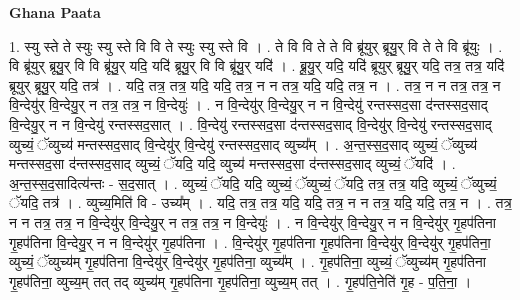 \documentclass[17pt]{extarticle}
\begin{document}
\textbf{Ghana Paata } \newline

1. स्यु स्ते ते स्युः स्यु स्ते वि वि ते स्युः स्यु स्ते वि । . ते वि वि ते ते वि ब्रू॑युर् ब्रूयु॒र् वि ते ते वि ब्रू॑युः । . वि ब्रू॑युर् ब्रूयु॒र् वि वि ब्रू॑यु॒र् यदि॒ यदि॑ ब्रूयु॒र् वि वि ब्रू॑यु॒र् यदि॑ । . ब्रू॒यु॒र् यदि॒ यदि॑ ब्रूयुर् ब्रूयु॒र् यदि॒ तत्र॒ तत्र॒ यदि॑ ब्रूयुर् ब्रूयु॒र् यदि॒ तत्र॑ । . यदि॒ तत्र॒ तत्र॒ यदि॒ यदि॒ तत्र॒ न न तत्र॒ यदि॒ यदि॒ तत्र॒ न । . तत्र॒ न न तत्र॒ तत्र॒ न वि॒न्देयु॑र् वि॒न्देयु॒र् न तत्र॒ तत्र॒ न वि॒न्देयुः॑ । . न वि॒न्देयु॑र् वि॒न्देयु॒र् न न वि॒न्देयु॑ रन्तस्सद॒सा द॑न्तस्सद॒साद् वि॒न्देयु॒र् न न वि॒न्देयु॑ रन्तस्सद॒सात् । . वि॒न्देयु॑ रन्तस्सद॒सा द॑न्तस्सद॒साद् वि॒न्देयु॑र् वि॒न्देयु॑ रन्तस्सद॒साद् व्युच्यं॒ ॅव्युच्य॑ मन्तस्सद॒साद् वि॒न्देयु॑र् वि॒न्देयु॑ रन्तस्सद॒साद् व्युच्य᳚म् । . अ॒न्त॒स्स॒द॒साद् व्युच्यं॒ ॅव्युच्य॑ मन्तस्सद॒सा द॑न्तस्सद॒साद् व्युच्यं॒ ॅयदि॒ यदि॒ व्युच्य॑ मन्तस्सद॒सा द॑न्तस्सद॒साद् व्युच्यं॒ ॅयदि॑ । . अ॒न्त॒स्स॒द॒सादित्य॑न्तः - स॒द॒सात् । . व्युच्यं॒ ॅयदि॒ यदि॒ व्युच्यं॒ ॅव्युच्यं॒ ॅयदि॒ तत्र॒ तत्र॒ यदि॒ व्युच्यं॒ ॅव्युच्यं॒ ॅयदि॒ तत्र॑ । . व्युच्य॒मिति॑ वि - उच्य᳚म् । . यदि॒ तत्र॒ तत्र॒ यदि॒ यदि॒ तत्र॒ न न तत्र॒ यदि॒ यदि॒ तत्र॒ न । . तत्र॒ न न तत्र॒ तत्र॒ न वि॒न्देयु॑र् वि॒न्देयु॒र् न तत्र॒ तत्र॒ न वि॒न्देयुः॑ । . न वि॒न्देयु॑र् वि॒न्देयु॒र् न न वि॒न्देयु॑र् गृ॒हप॑तिना गृ॒हप॑तिना वि॒न्देयु॒र् न न वि॒न्देयु॑र् गृ॒हप॑तिना । . वि॒न्देयु॑र् गृ॒हप॑तिना गृ॒हप॑तिना वि॒न्देयु॑र् वि॒न्देयु॑र् गृ॒हप॑तिना॒ व्युच्यं॒ ॅव्युच्य॑म् गृ॒हप॑तिना वि॒न्देयु॑र् वि॒न्देयु॑र् गृ॒हप॑तिना॒ व्युच्य᳚म् । . गृ॒हप॑तिना॒ व्युच्यं॒ ॅव्युच्य॑म् गृ॒हप॑तिना गृ॒हप॑तिना॒ व्युच्य॒म् तत् तद् व्युच्य॑म् गृ॒हप॑तिना गृ॒हप॑तिना॒ व्युच्य॒म् तत् । . गृ॒हप॑ति॒नेति॑ गृ॒ह - प॒ति॒ना॒ । \newline
\end{document}
